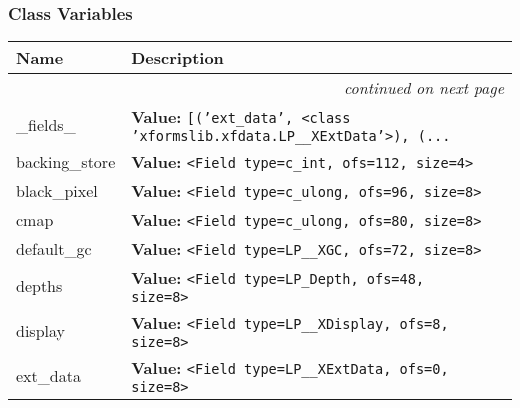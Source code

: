 
  \subsubsection{Class Variables}

    \vspace{-1cm}
\hspace{\varindent}\begin{longtable}{|p{\varnamewidth}|p{\vardescrwidth}|l}
\cline{1-2}
\cline{1-2} \centering \textbf{Name} & \centering \textbf{Description}& \\
\cline{1-2}
\endhead\cline{1-2}\multicolumn{3}{r}{\small\textit{continued on next page}}\\\endfoot\cline{1-2}
\endlastfoot\raggedright \_\-f\-i\-e\-l\-d\-s\-\_\- & \raggedright \textbf{Value:} 
{\tt \texttt{[}\texttt{(}\texttt{'}\texttt{ext\_data}\texttt{'}\texttt{, }{\textless}class 'xformslib.xfdata.LP\_\_XExtData'{\textgreater}\texttt{)}\texttt{, }\texttt{(}\texttt{...}}&\\
\cline{1-2}
\raggedright b\-a\-c\-k\-i\-n\-g\-\_\-s\-t\-o\-r\-e\- & \raggedright \textbf{Value:} 
{\tt {\textless}Field type=c\_int, ofs=112, size=4{\textgreater}}&\\
\cline{1-2}
\raggedright b\-l\-a\-c\-k\-\_\-p\-i\-x\-e\-l\- & \raggedright \textbf{Value:} 
{\tt {\textless}Field type=c\_ulong, ofs=96, size=8{\textgreater}}&\\
\cline{1-2}
\raggedright c\-m\-a\-p\- & \raggedright \textbf{Value:} 
{\tt {\textless}Field type=c\_ulong, ofs=80, size=8{\textgreater}}&\\
\cline{1-2}
\raggedright d\-e\-f\-a\-u\-l\-t\-\_\-g\-c\- & \raggedright \textbf{Value:} 
{\tt {\textless}Field type=LP\_\_XGC, ofs=72, size=8{\textgreater}}&\\
\cline{1-2}
\raggedright d\-e\-p\-t\-h\-s\- & \raggedright \textbf{Value:} 
{\tt {\textless}Field type=LP\_Depth, ofs=48, size=8{\textgreater}}&\\
\cline{1-2}
\raggedright d\-i\-s\-p\-l\-a\-y\- & \raggedright \textbf{Value:} 
{\tt {\textless}Field type=LP\_\_XDisplay, ofs=8, size=8{\textgreater}}&\\
\cline{1-2}
\raggedright e\-x\-t\-\_\-d\-a\-t\-a\- & \raggedright \textbf{Value:} 
{\tt {\textless}Field type=LP\_\_XExtData, ofs=0, size=8{\textgreater}}&\\

\end{longtable}
